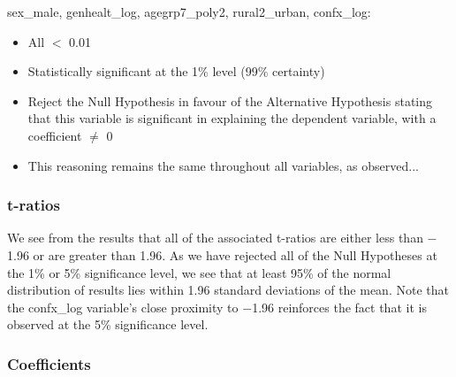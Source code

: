 \documentclass[11pt, english]{article}
\begin{document}
	sex\_male, genhealt\_log, agegrp7\_poly2, rural2\_urban, confx\_log:

	\begin{itemize}
	\setlength\itemsep{0cm}
		\item All $<$ 0.01
		\item Statistically significant at the 1\% level (99\% certainty)
		\item Reject the Null Hypothesis in favour of the Alternative Hypothesis stating that this variable is significant in explaining the dependent variable, with a coefficient $\neq$ 0
		\item This reasoning remains the same throughout all variables, as observed...
	\end{itemize}

		\subsubsection{t-ratios}

	We see from the results that all of the associated t-ratios are either less than $-$1.96 or are greater than 1.96. As we have rejected all of the Null Hypotheses at the 1\% or 5\% significance level, we see that at least 95\% of the normal distribution of results lies within 1.96 standard deviations of the mean. Note that the confx\_log variable’s close proximity to $-$1.96 reinforces the fact that it is observed at the 5\% significance level.

		\subsubsection{Coefficients}
\end{document}
